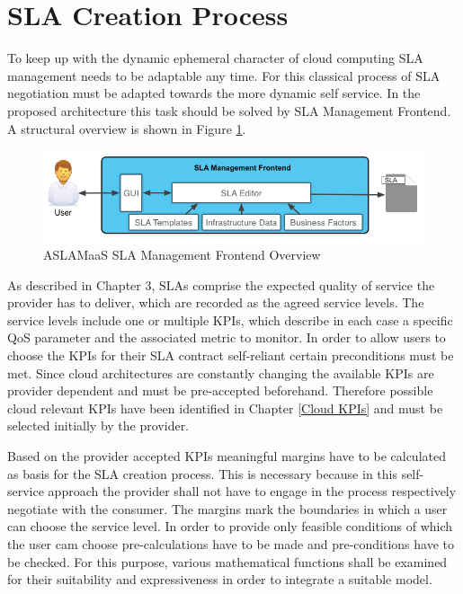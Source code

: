 \section{SLA Creation Process} \label{SLA creation}
To keep up with the dynamic ephemeral character of cloud computing SLA management needs to be adaptable any time. For this classical process of SLA negotiation must be adapted towards the more dynamic self service. In the proposed architecture this task should be solved by SLA Management Frontend. A structural overview is shown in Figure \ref{fig_Editor}.

\begin{figure}[!ht]
\centering
\includegraphics[width=5.3in]{chapters/chapter4/fig/Editor.PNG}
\caption{ASLAMaaS SLA Management Frontend Overview}
\label{fig_Editor}
\end{figure}

As described in Chapter 3, SLAs comprise the expected quality of service the provider has to deliver, which are recorded as the agreed service levels. The service levels include one or multiple KPIs, which describe in each case a specific QoS parameter and the associated metric to monitor. In order to allow users to choose the KPIs for their SLA contract self-reliant certain preconditions must be met. Since cloud architectures are constantly changing the available KPIs are provider dependent and must be pre-accepted beforehand. Therefore possible cloud relevant KPIs have been identified in Chapter \ref{Cloud KPIs} and must be selected initially by the provider.

Based on the provider accepted KPIs meaningful margins have to be calculated as basis for the SLA creation process. This is necessary because in this self-service approach the provider shall not have to engage in the process respectively negotiate with the consumer. The margins mark the boundaries in which a user can choose the service level. In order to provide only feasible conditions of which the user cam choose pre-calculations have to be made and pre-conditions have to be checked. For this purpose, various mathematical functions shall be examined for their suitability and expressiveness in order to integrate a suitable model.

